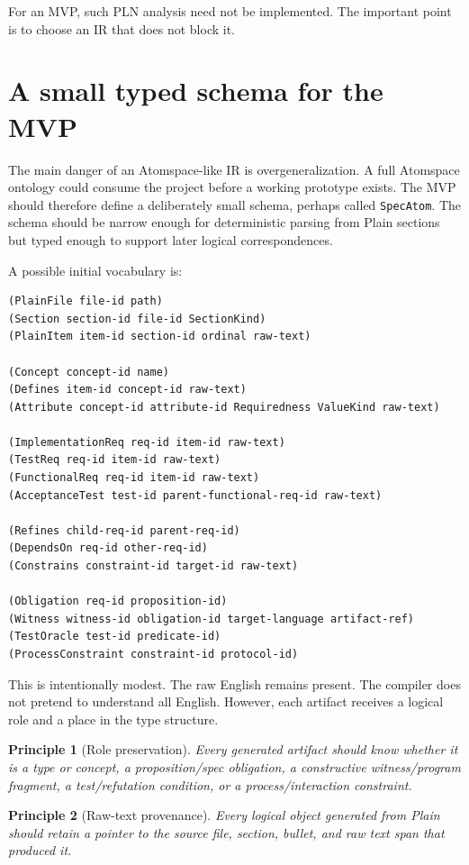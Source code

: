 \documentclass[11pt]{article}
\newtheorem{principle}{Principle}
\begin{document}
For an MVP, such PLN analysis need not be implemented. The important point is to
choose an IR that does not block it.

\section{A small typed schema for the MVP}

The main danger of an Atomspace-like IR is overgeneralization. A full Atomspace
ontology could consume the project before a working prototype exists. The MVP
should therefore define a deliberately small schema, perhaps called
\texttt{SpecAtom}. The schema should be narrow enough for deterministic parsing
from Plain sections but typed enough to support later logical correspondences.

A possible initial vocabulary is:

\begin{verbatim}
(PlainFile file-id path)
(Section section-id file-id SectionKind)
(PlainItem item-id section-id ordinal raw-text)

(Concept concept-id name)
(Defines item-id concept-id raw-text)
(Attribute concept-id attribute-id Requiredness ValueKind raw-text)

(ImplementationReq req-id item-id raw-text)
(TestReq req-id item-id raw-text)
(FunctionalReq req-id item-id raw-text)
(AcceptanceTest test-id parent-functional-req-id raw-text)

(Refines child-req-id parent-req-id)
(DependsOn req-id other-req-id)
(Constrains constraint-id target-id raw-text)

(Obligation req-id proposition-id)
(Witness witness-id obligation-id target-language artifact-ref)
(TestOracle test-id predicate-id)
(ProcessConstraint constraint-id protocol-id)
\end{verbatim}

This is intentionally modest. The raw English remains present. The compiler does
not pretend to understand all English. However, each artifact receives a logical
role and a place in the type structure.

\begin{principle}[Role preservation]
Every generated artifact should know whether it is a type or concept, a
proposition/spec obligation, a constructive witness/program fragment, a
test/refutation condition, or a process/interaction constraint.
\end{principle}

\begin{principle}[Raw-text provenance]
Every logical object generated from Plain should retain a pointer to the source
file, section, bullet, and raw text span that produced it.
\end{principle}
\end{document}
